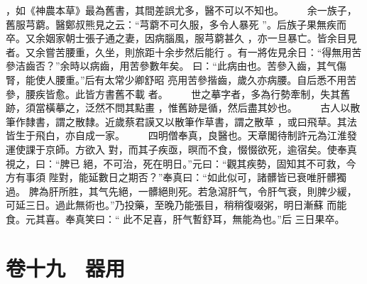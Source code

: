 \documentclass{ctexart}
\begin{document}
，如《神農本草》最為舊書，其間差誤尤多，醫不可以不知也。 　　余一族子，舊服芎藭。醫鄭叔熊見之云：``芎藭不可久服，多令人暴死 ''。后族子果無疾而卒。又余姻家朝士張子通之妻，因病腦風，服芎藭甚久 ，亦一旦暴亡。皆余目見者。又余嘗苦腰重，久坐，則旅距十余步然后能行 。有一將佐見余日：``得無用苦參洁齒否？''余時以病齒，用苦參數年矣。 曰：``此病由也。苦參入齒，其气傷腎，能使人腰重。''后有太常少卿舒昭 亮用苦參揩齒，歲久亦病腰。自后悉不用苦參，腰疾皆愈。此皆方書舊不載 者。 　　世之摹字者，多為行勢牽制，失其舊跡，須當橫摹之，泛然不問其點畫 ，惟舊跡是循，然后盡其妙也。 　　古人以散筆作隸書，謂之散隸。近歲蔡君謨又以散筆作草書，謂之散草 ，或曰飛草。其法皆生于飛白，亦自成一家。 　　四明僧奉真，良醫也。天章閣待制許元為江淮發運使課于京師。方欲入 對，而其子疾亟，暝而不食，惙惙欲死，逾宿矣。使奉真視之，曰：``脾已 絕，不可治，死在明日。''元曰：``觀其疾勢，固知其不可救，今方有事須 陛對，能延數日之期否？''奉真曰：``如此似可，諸髒皆已衰唯肝髒獨過。 脾為肝所胜，其气先絕，一髒絕則死。若急瀉肝气，令肝气衰，則脾少緩， 可延三日。過此無術也。''乃投藥，至晚乃能張目，稍稍復啜粥，明日漸蘇 而能食。元其喜。奉真笑曰：`` 此不足喜，肝气暫舒耳，無能為也。''后 三日果卒。
\clearpage
\section{卷十九　器用}
\end{document}
